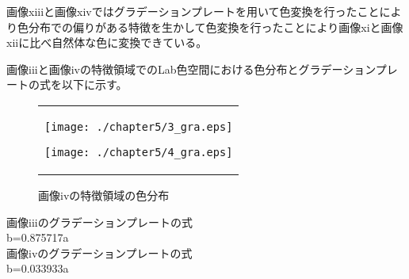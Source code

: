 画像xiiiと画像xivではグラデーションプレートを用いて色変換を行ったことにより色分布での偏りがある特徴を生かして色変換を行ったことにより画像xiと画像xiiに比べ自然体な色に変換できている。\par

画像iiiと画像ivの特徴領域でのLab色空間における色分布とグラデーションプレートの式を以下に示す。
\begin{figure}[htbp]
  \begin{center}
    \begin{tabular}{c}

      \begin{minipage}{0.45\hsize}
        \begin{center}
          \texttt{[image: ./chapter5/3\_gra.eps]}
          \caption{画像iiiの特徴領域の色分布}
          \label{fig:seininhsv}
        \end{center}
      \end{minipage}

      \begin{minipage}{0.45\hsize}
        \begin{center}
          \texttt{[image: ./chapter5/4\_gra.eps]}
          \caption{画像ivの特徴領域の色分布}
          \label{fig:kinninhsv}
        \end{center}
      \end{minipage}


    \end{tabular}
  \end{center}
\end{figure}

\begin{screen}
画像iiiのグラデーションプレートの式\\
b=0.875717a\\
画像ivのグラデーションプレートの式\\
b=0.033933a
  \end{screen}

